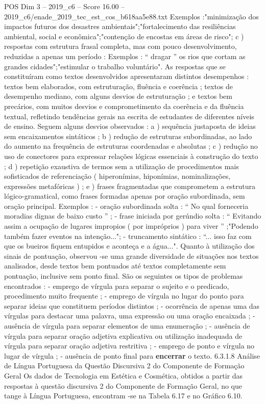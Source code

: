 \begin{textsample}{POS Dim 3 – 2019\_c6 – Score 16.00 – 2019\_c6/enade\_2019\_tec\_est\_cos\_b618aa5e88.txt}
Exemplos :"minimização dos impactos futuros dos desastres ambientais";"fortalecimento das resiliências ambiental, social e econômica";"contenção de encostas em áreas de risco"; c ) respostas com estrutura frasal completa, mas com pouco desenvolvimento, reduzidas a apenas um período : Exemplos : “ dragar ” os rios que cortam as grandes cidades";"estimular o trabalho voluntário".
As respostas que se constituíram como textos desenvolvidos apresentaram distintos desempenhos : textos bem elaborados, com estruturação, fluência e coerência ; textos de desempenho mediano, com alguns desvios de estruturação ; e textos bem precários, com muitos desvios e comprometimento da coerência e da fluência textual, refletindo tendências gerais na escrita de estudantes de diferentes níveis de ensino.
Seguem alguns desvios observados : a ) sequência justaposta de ideias sem encaixamentos sintáticos ; b ) redução de estruturas subordinadas, ao lado do aumento na frequência de estruturas coordenadas e absolutas ; c ) redução no uso de conectores para expressar relações lógicas essenciais à construção do texto ; d ) repetição exaustiva de termos sem a utilização de procedimentos mais sofisticados de referenciação ( hiperonímias, hiponímias, nominalizações, expressões metafóricas ) ; e ) frases fragmentadas que comprometem a estrutura lógico-gramatical, como frases formadas apenas por oração subordinada, sem oração principal.
Exemplos : - oração subordinada solta : “ No qual forneceria moradias dignas de baixo custo ” ; - frase iniciada por gerúndio solta : “ Evitando assim a ocupação de lugares impropios ( por impróprios ) para viver ” ;"Podendo também fazer eventos na intenção..."; - truncamento sintático : “... isso faz com que os bueiros fiquem entupidos e aconteça e a água...".
Quanto à utilização dos sinais de pontuação, observou -se uma grande diversidade de situações nos textos analisados, desde textos bem pontuados até textos completamente sem pontuação, inclusive sem ponto final.
São os seguintes os tipos de problemas encontrados : - emprego de vírgula para separar o sujeito e o predicado, procedimento muito frequente ; - emprego de vírgula no lugar do ponto para separar ideias que constituem períodos distintos ; - ocorrência de apenas uma das vírgulas para destacar uma palavra, uma expressão ou uma oração encaixada ; - ausência de vírgula para separar elementos de uma enumeração ; - ausência de vírgula para separar oração adjetiva explicativa ou utilização inadequada de vírgula para separar oração adjetiva restritiva ; - emprego de ponto e vírgula no lugar de vírgula ; - ausência de ponto final para \textbf{encerrar} o texto. 6.3.1.8 Análise de Língua Portuguesa da Questão Discursiva 2 do Componente de Formação Geral Os dados de Tecnologia em Estética e Cosmética, obtidos a partir das respostas à questão discursiva 2 do Componente de Formação Geral, no que tange à Língua Portuguesa, encontram -se na Tabela 6.17 e no Gráfico 6.10.

\end{textsample}
